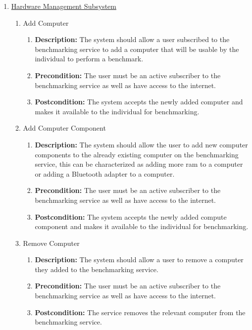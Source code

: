 \documentclass{article}
\begin{document}
\begin{enumerate}
	\item \underline{Hardware Management Subsystem}
    \begin{enumerate}
		\item Add Computer
		\begin{enumerate}
			\item \textbf{Description:} The system should allow a user subscribed to the benchmarking service to add a computer that will be usable by the individual to perform a benchmark. 
			\item \textbf{Precondition:} The user must be an active subscriber to the benchmarking service as well as have access to the internet.
			\item \textbf{Postcondition:} The system accepts the newly added computer and makes it available to the individual for benchmarking.\newline
		\end{enumerate}
        
        \item Add Computer Component 
		\begin{enumerate}
			\item \textbf{Description:} The system should allow the user to add new computer components to the already existing	computer on the benchmarking service, this can be characterized as adding more ram to a computer or adding a Bluetooth adapter to a computer.
			\item \textbf{Precondition:} The user must be an active subscriber to the benchmarking service as well as have access to the internet.
			\item \textbf{Postcondition:} The system accepts the newly added compute component and makes it available to the individual for benchmarking.\newline
		\end{enumerate}
        
        \item Remove Computer
		\begin{enumerate}
			\item \textbf{Description:} The system should allow a user to remove a computer they added to the benchmarking service.
			\item \textbf{Precondition:} The user must be an active subscriber to the benchmarking service as well as have access to the internet.
			\item \textbf{Postcondition:} The service removes the relevant computer from the benchmarking service.\newline
		\end{enumerate}
        

\end{enumerate}
\end{enumerate}
\end{document}

